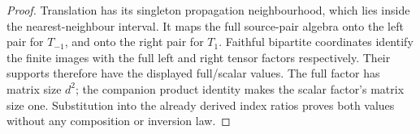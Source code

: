 \begin{proof}\leanok
    Translation has its singleton propagation neighbourhood, which lies
    inside the nearest-neighbour interval. It maps the full source-pair
    algebra onto the left pair for $T_{-1}$, and onto the right pair for
    $T_1$. Faithful bipartite coordinates identify the finite images with
    the full left and right tensor factors respectively. Their supports
    therefore have the displayed full/scalar values. The full factor has
    matrix size $d^2$; the companion product identity makes the scalar
    factor's matrix size one. Substitution into the already derived index
    ratios proves both values without any composition or inversion law.
\end{proof}
